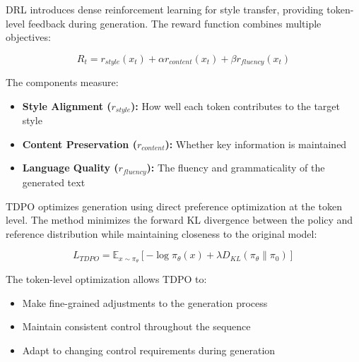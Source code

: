 DRL introduces dense reinforcement learning for style transfer, providing token-level feedback during generation. The reward function combines multiple objectives:

\begin{equation}
   R_t = r_{style}(x_t) + \alpha r_{content}(x_t) + \beta r_{fluency}(x_t)
\end{equation}

The components measure:
\begin{itemize}
   \item \textbf{Style Alignment ($r_{style}$):} How well each token contributes to the target style
   \item \textbf{Content Preservation ($r_{content}$):} Whether key information is maintained
   \item \textbf{Language Quality ($r_{fluency}$):} The fluency and grammaticality of the generated text
\end{itemize}

% 
% 
% 
% 

TDPO optimizes generation using direct preference optimization at the token level. The method minimizes the forward KL divergence between the policy and reference distribution while maintaining closeness to the original model:

\begin{equation}
   L_{TDPO} = \mathbb{E}_{x\sim\pi_\theta}[-\log\pi_\theta(x) + \lambda D_{KL}(\pi_\theta\|\pi_0)]
\end{equation}

The token-level optimization allows TDPO to:

\begin{itemize}
   \item Make fine-grained adjustments to the generation process
   \item Maintain consistent control throughout the sequence
   \item Adapt to changing control requirements during generation
\end{itemize}

